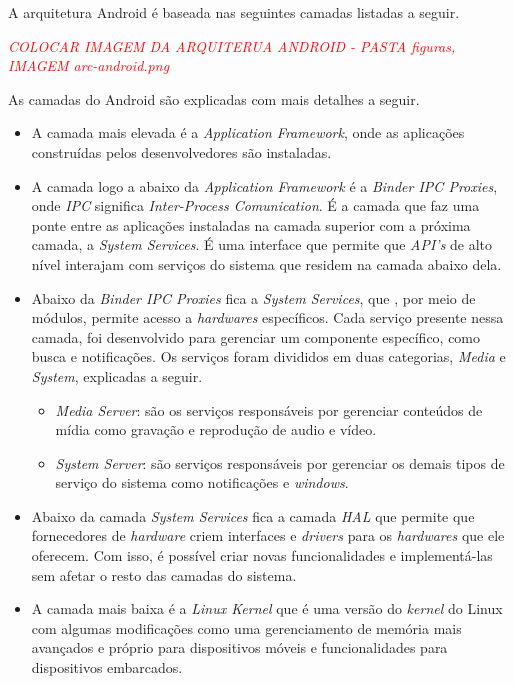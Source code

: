 A arquitetura Android é baseada nas seguintes camadas listadas a seguir. 

\textit{\textcolor{red}{COLOCAR IMAGEM DA ARQUITERUA ANDROID - PASTA figuras, IMAGEM arc-android.png}}

As camadas do Android são explicadas com mais detalhes a seguir.

\begin{itemize}

    \item A camada mais elevada é a \textit{Application Framework}, onde as aplicações construídas pelos desenvolvedores são instaladas.
    \item A camada logo a abaixo da \textit{Application Framework} é a \textit{Binder IPC Proxies}, onde \textit{IPC} significa \textit{Inter-Process Comunication}.
    É a camada que faz uma ponte entre as aplicações instaladas na camada superior com a próxima camada, a \textit{System Services}. É uma interface que permite que \textit{API's}
    de alto nível interajam com serviços do sistema que residem na camada abaixo dela. 
    \item Abaixo da \textit{Binder IPC Proxies} fica a \textit{System Services}, que , por meio de módulos, permite acesso a \textit{hardwares} específicos. Cada serviço presente nessa camada,
    foi desenvolvido para gerenciar um componente específico, como busca e notificações. Os serviços foram divididos em duas categorias, \textit{Media} e \textit{System}, explicadas a seguir.
    \begin{itemize}
        \item \textit{Media Server}: são os serviços responsáveis por gerenciar conteúdos de mídia como gravação e reprodução de audio e vídeo. 
        \item \textit{System Server}: são serviços responsáveis por gerenciar os demais tipos de serviço do sistema como notificações e \textit{windows}.
    \end{itemize}
    \item Abaixo da camada \textit{System Services} fica a camada \textit{HAL} que permite que fornecedores de \textit{hardware} criem interfaces e \textit{drivers} para os \textit{hardwares} que
    ele oferecem. Com isso, é possível criar novas funcionalidades e implementá-las sem afetar o resto das camadas do sistema.  
    \item A camada mais baixa é a \textit{Linux Kernel} que é uma versão do \textit{kernel} do Linux com algumas modificações como uma gerenciamento de memória mais avançados e próprio para dispositivos 
    móveis e funcionalidades para dispositivos embarcados. 
    
\end{itemize}

